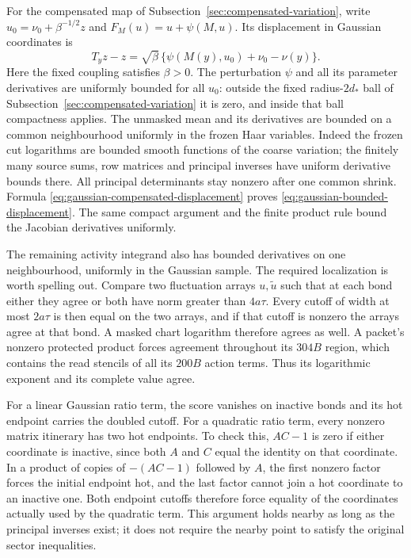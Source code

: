 For the compensated map of
Subsection~\ref{sec:compensated-variation}, write
$u_0=\nu_0+\beta^{-1/2}z$ and
$F_M(u)=u+\psi(M,u)$. Its displacement in Gaussian coordinates is
\begin{equation}\label{eq:gaussian-compensated-displacement}
 T_yz-z=\sqrt\beta\,
   \{\psi(M(y),u_0)+\nu_0-\nu(y)\}.
\end{equation}
Here the fixed coupling satisfies $\beta>0$. The perturbation
$\psi$ and all its parameter derivatives are uniformly bounded
for all $u_0$: outside the fixed radius-$2d_*$ ball of
Subsection~\ref{sec:compensated-variation} it is zero, and
inside that ball compactness applies. The unmasked mean and its
derivatives are bounded on a common neighbourhood uniformly in
the frozen Haar variables. Indeed the frozen cut logarithms are
bounded smooth functions of the coarse variation; the finitely
many source sums, row matrices and principal inverses have uniform
derivative bounds there. All principal determinants stay nonzero
after one common shrink. Formula
\eqref{eq:gaussian-compensated-displacement} proves
\eqref{eq:gaussian-bounded-displacement}. The same compact argument
and the finite product rule bound the Jacobian derivatives uniformly.

The remaining activity integrand also has bounded derivatives on
one neighbourhood, uniformly in the Gaussian sample. The required
localization is worth spelling out. Compare two fluctuation arrays
$u,\widetilde u$ such that at each bond either they agree or both
have norm greater than $4a\tau$. Every cutoff of width at most
$2a\tau$ is then equal on the two arrays, and if that cutoff is
nonzero the arrays agree at that bond. A masked chart logarithm
therefore agrees as well. A packet's nonzero protected product
forces agreement throughout its $304B$ region, which contains the
read stencils of all its $200B$ action terms. Thus its logarithmic
exponent and its complete value agree.

For a linear Gaussian ratio term, the score vanishes on inactive
bonds and its hot endpoint carries the doubled cutoff. For a
quadratic ratio term, every nonzero matrix itinerary has two hot
endpoints. To check this, $AC-1$ is zero if either coordinate is
inactive, since both $A$ and $C$ equal the identity on that
coordinate. In a product of copies of $-(AC-1)$ followed by $A$,
the first nonzero factor forces the initial endpoint hot, and the
last factor cannot join a hot coordinate to an inactive one.
Both endpoint cutoffs therefore force equality of the coordinates
actually used by the quadratic term. This argument holds nearby
as long as the principal inverses exist; it does not require the
nearby point to satisfy the original sector inequalities.

